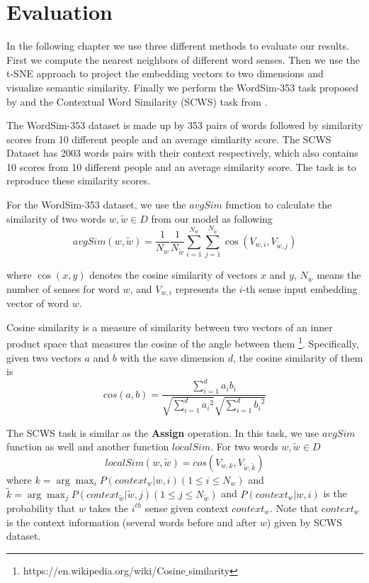\chapter{Evaluation}
\label{cha:evaluation}


In the following chapter we use three different methods to evaluate our results. First we compute the nearest neighbors of different word senses. Then we use the t-SNE approach to project the embedding vectors to two dimensions and visualize semantic similarity. Finally we perform the  WordSim-353 task proposed by \cite{FinkelsteinGabrilovichEtAl2001} and the Contextual Word Similarity (SCWS) task from \cite{HuangSocherEtAl2012}.

The WordSim-353 dataset is made up by 353 pairs of words followed by similarity scores from 10 different people and an average similarity score. The SCWS Dataset has 2003 words pairs with their context respectively, which also contains 10 scores from 10 different people and an average similarity score. The task is to reproduce these similarity scores.

For the WordSim-353 dataset, we use the $avgSim$ function to calculate the similarity of two words $w,\tilde{w}\in D$ from our model as following
\begin{equation}
avgSim(w,\tilde{w})
=\frac{1}{N_w}\frac{1}{N_{\tilde{w}}}\sum_{i=1}^{N_w}\sum_{j=1}^{N_{\tilde{w}}}\cos(V_{w,i},V_{\tilde{w},j})
\end{equation}

where $\cos(x, y)$ denotes the cosine similarity of vectors $x$ and $y$, $N_w$ means the number of senses for word $w$, and $V_{w,i}$ represents the $i$-th sense input embedding vector of word $w$. 

Cosine similarity is a measure of similarity between two vectors of an inner product space that measures the cosine of the angle between them \footnote{https://en.wikipedia.org/wiki/Cosine$\_$similarity}. Specifically, given two vectors $a$ and $b$ with the save dimension $d$, the cosine similarity of them is
$$cos(a,b)=\frac{\sum_{i=1}^d a_i b_i}{\sqrt{\sum_{i=1}^d {a_i}^2}\sqrt{\sum_{i=1}^d {b_i}^2}}$$

The SCWS task is similar as the \textbf{Assign} operation. In this task, we use $avgSim$ function as well and another function $localSim$. For two words $w,\tilde{w}\in D$
$$localSim(w,\tilde{w})=cos(V_{w,k},V_{\tilde{w},\tilde{k}})$$
where $k=\arg\max_i P(context_w|w,i) (1\leq i\leq N_w)$ and ${\tilde{k}}=\arg\max_j P(context_{\tilde{w}}|{\tilde{w}},j)  (1\leq j\leq N_{\tilde{w}})$ and $P(context_w|w,i)$ is the probability that $w$ takes the $i^{th}$ sense given context $context_w$. Note that $context_w$ is the context information (several words before and after $w$) given by SCWS dataset.

